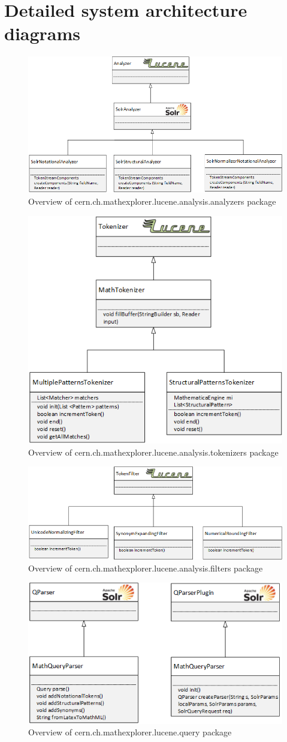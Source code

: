 \chapter{Detailed system architecture diagrams}

\begin{figure}[h!]
	\centering
	\includegraphics[height=4 cm]{visio_drawings/analyzers.png}
	\caption{Overview of {\small{\codefont cern.ch.mathexplorer.lucene.analysis.analyzers}} package}
	\label{uml_analyzers}
\end{figure}

\begin{figure}[h!]
	\centering
	\includegraphics[height=4 cm]{visio_drawings/tokenizers.png}
	\caption{Overview of {\small{\codefont cern.ch.mathexplorer.lucene.analysis.tokenizers}} package}
	\label{uml_tokenizers}
\end{figure}

\begin{figure}[h!]
	\centering
	\includegraphics[height=4 cm]{visio_drawings/filters.png}
	\caption{Overview of {\small{\codefont cern.ch.mathexplorer.lucene.analysis.filters}} package}
	\label{uml_filters}
\end{figure}

\begin{figure}[h!]
	\centering
	\includegraphics[height=4 cm]{visio_drawings/query.png}
	\caption{Overview of {\small{\codefont cern.ch.mathexplorer.lucene.query}} package}
	\label{uml_filters}
\end{figure}

